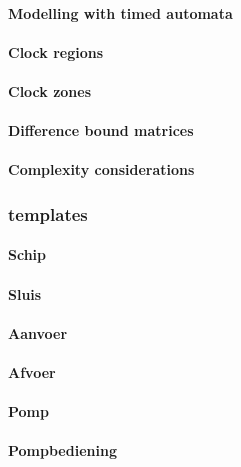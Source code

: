 \paragraph{Modelling with timed automata}
\paragraph{Clock regions}
\paragraph{Clock zones}
\paragraph{Difference bound matrices}
\paragraph{Complexity considerations}



\subsubsection{templates}

\paragraph{Schip}

\paragraph{Sluis}


\paragraph{Aanvoer}


\paragraph{Afvoer}

\paragraph{Pomp}

\paragraph{Pompbediening}


